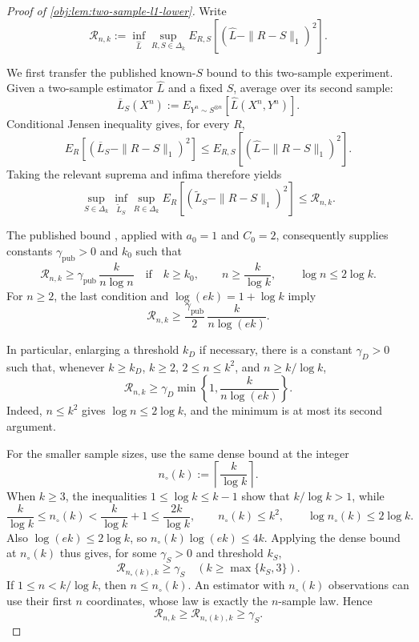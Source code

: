 \begin{proof}[Proof of \cref{obj:lem:two-sample-l1-lower}]
Write
\[
\mathcal R_{n,k}:=
\inf_{\widehat L}\sup_{R,S\in\Delta_k}
E_{R,S}\!\left[(\widehat L-\|R-S\|_1)^2\right].
\] %

We first transfer the published known-\(S\) bound to this two-sample experiment. Given a two-sample estimator \(\widehat L\) and a fixed \(S\), average over its second sample:
\[
\overline L_S(X^n):=
E_{Y^n\sim S^{\otimes n}}\!\left[\widehat L(X^n,Y^n)\right].
\]
Conditional Jensen inequality gives, for every \(R\),
\[
E_R\!\left[(\overline L_S-\|R-S\|_1)^2\right]
\leq E_{R,S}\!\left[(\widehat L-\|R-S\|_1)^2\right].
\]
Taking the relevant suprema and infima therefore yields
\[
\sup_{S\in\Delta_k}\inf_{\widetilde L_S}\sup_{R\in\Delta_k}
E_R\!\left[(\widetilde L_S-\|R-S\|_1)^2\right]
\leq \mathcal R_{n,k}.
\] %

The published bound \citep[Theorem 3 and the unknown-both-distributions reduction following Theorem 6]{JiaoHanWeissman2018}, applied with \(a_0=1\) and \(C_0=2\), consequently supplies constants \(\gamma_{\mathrm{pub}}>0\) and \(k_0\) such that
\[
\mathcal R_{n,k}\geq \gamma_{\mathrm{pub}}\,\frac{k}{n\log n}
\quad\text{if}\quad
k\geq k_0,\qquad n\geq\frac{k}{\log k},
\qquad \log n\leq2\log k.
\]
For \(n\geq2\), the last condition and \(\log(ek)=1+\log k\) imply
\[
\mathcal R_{n,k}\geq
\frac{\gamma_{\mathrm{pub}}}{2}\,\frac{k}{n\log(ek)}.
\] %

In particular, enlarging a threshold \(k_D\) if necessary, there is a constant \(\gamma_D>0\) such that, whenever \(k\geq k_D\), \(k\geq2\), \(2\leq n\leq k^2\), and \(n\geq k/\log k\),
\[
\mathcal R_{n,k}\geq
\gamma_D\min\left\{1,\frac{k}{n\log(ek)}\right\}.
\]
Indeed, \(n\leq k^2\) gives \(\log n\leq2\log k\), and the minimum is at most its second argument. %

For the smaller sample sizes, use the same dense bound at the integer
\[
n_\circ(k):=\left\lceil\frac{k}{\log k}\right\rceil.
\]
When \(k\geq3\), the inequalities \(1\leq\log k\leq k-1\) show that \(k/\log k>1\), while
\[
\frac{k}{\log k}\leq n_\circ(k)
<\frac{k}{\log k}+1
\leq\frac{2k}{\log k},
\qquad
n_\circ(k)\leq k^2,
\qquad
\log n_\circ(k)\leq2\log k.
\]
Also \(\log(ek)\leq2\log k\), so \(n_\circ(k)\log(ek)\leq4k\). Applying the dense bound at \(n_\circ(k)\) thus gives, for some \(\gamma_S>0\) and threshold \(k_S\),
\[
\mathcal R_{n_\circ(k),k}\geq\gamma_S
\quad (k\geq\max\{k_S,3\}).
\]
If \(1\leq n<k/\log k\), then \(n\leq n_\circ(k)\). An estimator with \(n_\circ(k)\) observations can use their first \(n\) coordinates, whose law is exactly the \(n\)-sample law. Hence
\[
\mathcal R_{n,k}\geq\mathcal R_{n_\circ(k),k}
\geq\gamma_S.
\] %


\end{proof}
